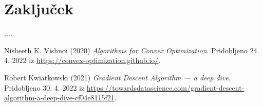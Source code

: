 \documentclass{article}
\begin{document}
\newpage
\section{Zaključek}
....
%
%

\begin{thebibliography}{9}
Nisheeth K. Vishnoi (2020) \emph{Algorithms for Convex Optimization}. Pridobljeno 24. 4. 2022 iz \url{https://convex-optimization.github.io/}.

Robert Kwiatkowski (2021) \emph{Gradient Descent Algorithm — a deep dive}. Pridobljeno 30. 4. 2022 iz \url{https://towardsdatascience.com/gradient-descent-algorithm-a-deep-dive-cf04e8115f21}.

\end{thebibliography}
\end{document}
